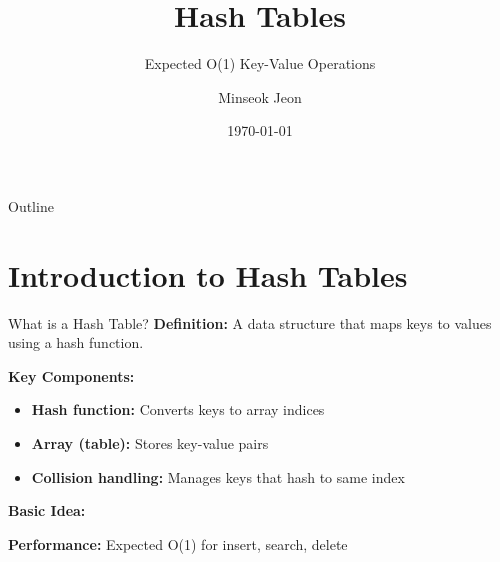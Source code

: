 \documentclass[aspectratio=169]{beamer}
\title{Hash Tables}
\subtitle{Expected O(1) Key-Value Operations}
\author{Minseok Jeon}
\institute{DGIST}
\date{\today}
\begin{document}
\begin{frame}
  \titlepage
\end{frame}

\begin{frame}{Outline}
  \tableofcontents
\end{frame}

\section{Introduction to Hash Tables}

\begin{frame}{What is a Hash Table?}
  \textbf{Definition:} A data structure that maps keys to values using a hash function.

  \vspace{0.3cm}
  \textbf{Key Components:}
  \begin{itemize}
    \item \textbf{Hash function:} Converts keys to array indices
    \item \textbf{Array (table):} Stores key-value pairs
    \item \textbf{Collision handling:} Manages keys that hash to same index
  \end{itemize}

  \vspace{0.3cm}
  \textbf{Basic Idea:}
  \begin{center}
  \end{center}

  \vspace{0.3cm}
  \textbf{Performance:} Expected O(1) for insert, search, delete
\end{frame}
\end{document}
